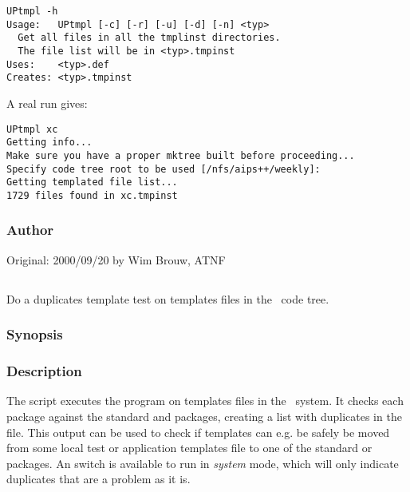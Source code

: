 \begin{verbatim}
UPtmpl -h
Usage:   UPtmpl [-c] [-r] [-u] [-d] [-n] <typ>
  Get all files in all the tmplinst directories.
  The file list will be in <typ>.tmpinst
Uses:    <typ>.def
Creates: <typ>.tmpinst
\end{verbatim}

\noindent
A real run gives:

\begin{verbatim}
UPtmpl xc
Getting info...
Make sure you have a proper mktree built before proceeding...
Specify code tree root to be used [/nfs/aips++/weekly]: 
Getting templated file list...
1729 files found in xc.tmpinst
\end{verbatim}

\subsubsection*{Author}

Original: 2000/09/20 by Wim Brouw, ATNF


\newpage

\subsection{}
\label{UPdup}

Do a duplicates template test on templates files in the \aipspp\ code tree.

\subsubsection*{Synopsis}

\begin{synopsis}
\end{synopsis}

\subsubsection*{Description}

\noindent
The  script executes the  program on templates
files in the \aipspp\ system. It checks each package against the standard
 and  packages, creating a list with duplicates in the
 file. This output can be used to check if templates can
e.g. be safely be moved from some local test or application templates file to
one of the standard  or  packages. An  switch is
available to run in {\em system} mode, which will only indicate duplicates
that are a problem as it is. 

